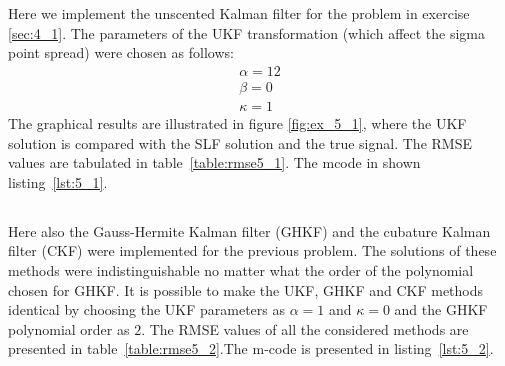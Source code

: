 \documentclass[a4paper,oneside,article]{memoir}
\begin{document}
\begin{table}[h]
	\centering
	
	\label{table:rmse4_3}
\end{table}

\clearpage




\section{}

\subsection{}\label{sec:5_1}

Here we implement the unscented Kalman filter for the problem in exercise \ref{sec:4_1}.
The parameters of the UKF transformation (which affect the sigma point spread) were chosen as follows:
\begin{align}
	\alpha = 12\\
	\beta = 0\\
	\kappa = 1
\end{align}
The graphical results are illustrated in figure \ref{fig:ex_5_1}, where the UKF solution
is compared with the SLF solution and the true signal. The RMSE values
are tabulated in table~\ref{table:rmse5_1}. The mcode in shown listing~\ref{lst:5_1}. 

\begin{table}[h]
	\centering
	
	\label{table:rmse5_1}
\end{table}



\clearpage





\subsection{}\label{sec:5_2}

Here also the Gauss-Hermite Kalman filter (GHKF) and the cubature Kalman filter (CKF)
were implemented for the previous problem. The solutions of these methods were
indistinguishable no matter what the order of the polynomial chosen for GHKF. It is possible
to make the UKF, GHKF and CKF methods identical by choosing the UKF parameters as $\alpha = 1$ 
and $\kappa=0$ and the GHKF polynomial order as $2$. The RMSE values of all the considered methods
are presented in table~\ref{table:rmse5_2}.The m-code is presented in listing~\ref{lst:5_2}.
\end{document}
